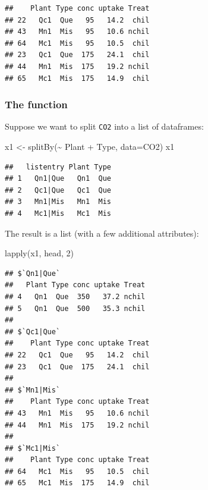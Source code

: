\documentclass[
]{article}
\newenvironment{Shaded}{\begin{snugshade}}{\end{snugshade}}
\newcommand{\AttributeTok}[1]{\textcolor[rgb]{0.77,0.63,0.00}{#1}}
\newcommand{\DecValTok}[1]{\textcolor[rgb]{0.00,0.00,0.81}{#1}}
\newcommand{\FunctionTok}[1]{\textcolor[rgb]{0.00,0.00,0.00}{#1}}
\newcommand{\NormalTok}[1]{#1}
\newcommand{\OtherTok}[1]{\textcolor[rgb]{0.56,0.35,0.01}{#1}}
\newcommand{\SpecialCharTok}[1]{\textcolor[rgb]{0.00,0.00,0.00}{#1}}
\begin{document}
\begin{verbatim}
##    Plant Type conc uptake Treat
## 22   Qc1  Que   95   14.2  chil
## 43   Mn1  Mis   95   10.6 nchil
## 64   Mc1  Mis   95   10.5  chil
## 23   Qc1  Que  175   24.1  chil
## 44   Mn1  Mis  175   19.2 nchil
## 65   Mc1  Mis  175   14.9  chil
\end{verbatim}

\hypertarget{the-function-2}{%
\subsubsection{\texorpdfstring{The 
function}{The  function}}\label{the-function-2}}

Suppose we want to split \texttt{CO2} into a list of dataframes:

\begin{Shaded}
\begin{Highlighting}[]
\NormalTok{x1 }\OtherTok{\textless{}{-}} \FunctionTok{splitBy}\NormalTok{(}\SpecialCharTok{\textasciitilde{}}\NormalTok{ Plant }\SpecialCharTok{+}\NormalTok{ Type, }\AttributeTok{data=}\NormalTok{CO2)}
\NormalTok{x1}
\end{Highlighting}
\end{Shaded}

\begin{verbatim}
##   listentry Plant Type
## 1   Qn1|Que   Qn1  Que
## 2   Qc1|Que   Qc1  Que
## 3   Mn1|Mis   Mn1  Mis
## 4   Mc1|Mis   Mc1  Mis
\end{verbatim}

The result is a list (with a few additional attributes):

\begin{Shaded}
\begin{Highlighting}[]
\FunctionTok{lapply}\NormalTok{(x1, head, }\DecValTok{2}\NormalTok{)}
\end{Highlighting}
\end{Shaded}

\begin{verbatim}
## $`Qn1|Que`
##   Plant Type conc uptake Treat
## 4   Qn1  Que  350   37.2 nchil
## 5   Qn1  Que  500   35.3 nchil
## 
## $`Qc1|Que`
##    Plant Type conc uptake Treat
## 22   Qc1  Que   95   14.2  chil
## 23   Qc1  Que  175   24.1  chil
## 
## $`Mn1|Mis`
##    Plant Type conc uptake Treat
## 43   Mn1  Mis   95   10.6 nchil
## 44   Mn1  Mis  175   19.2 nchil
## 
## $`Mc1|Mis`
##    Plant Type conc uptake Treat
## 64   Mc1  Mis   95   10.5  chil
## 65   Mc1  Mis  175   14.9  chil
\end{verbatim}
\end{document}
